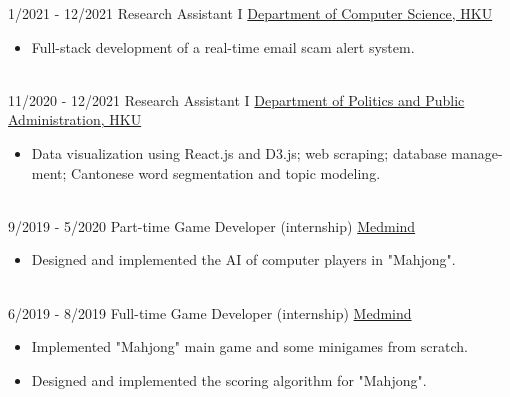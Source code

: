 \documentclass[letterpaper]{twentysecondcv} %
\begin{document}
\begin{twenty}
\twentyitem
		{1/2021 - 12/2021}
	{}
			{Research Assistant I}
			{\href{https://www.cs.hku.hk}{Department of Computer Science, HKU}}
		{}
		{\vspace{-2mm}\begin{itemize}[topsep=0pt,partopsep=0pt]
				\item Full-stack development of a real-time email scam alert system.
				\end{itemize} }\\

\twentyitem
		{11/2020 - 12/2021}
	{}
			{Research Assistant I}
			{\href{https://ppaweb.hku.hk}{Department of Politics and Public Administration, HKU}}
		{}
		{\vspace{-2mm}\begin{itemize}[topsep=0pt,partopsep=0pt]
				\item Data visualization using React.js and D3.js; web scraping; database manage- ment; Cantonese word segmentation and topic modeling.
				\end{itemize} }\\

\twentyitem
    	{9/2019 - 5/2020}
		{}
        {Part-time Game Developer (internship)}
        {\href{https://www.medmindtechnology.hk}{Medmind}}
        {}
        {\vspace{-2mm}\begin{itemize}[topsep=0pt,partopsep=0pt]
				\item Designed and implemented the AI of computer players in "Mahjong".
				\end{itemize}} \\
				
	\twentyitem
    	{6/2019 - 8/2019}
		{}
        {Full-time Game Developer (internship)}
        {\href{https://www.medmindtechnology.hk}{Medmind}}
        {}
        {\vspace{-2mm}\begin{itemize}[topsep=0pt,partopsep=0pt]
        \item Implemented "Mahjong" main game and some minigames from scratch.
        \item Designed and implemented the scoring algorithm for "Mahjong".
    \end{itemize}} \\
        
\end{twenty}

\vspace{-0.25cm}
\end{document}

